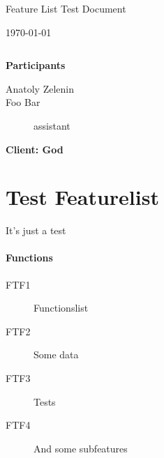 \documentclass[a4paper, 11pt, pdftex, fleqn, review]{article}
\begin{document}
		

		\thispagestyle{empty}

		\vspace*{3cm}
		\begin{center}
		\Large{Feature List Test Document}\\
		\end{center}

		\begin{center}
		\textbf{\LARGE{}}
		\end{center}

		\begin{center}
		\today
		\end{center}

		\begin{verbatim}

		\end{verbatim}
		\begin{center}
		\vspace*{1.5cm}

		\textbf{Participants}
		\\
		\begin{description}
		
			\item[Anatoly Zelenin] 
			\item[Foo Bar] assistant
		\end{description}

		\end{center}

		\vspace*{2cm} 

		\begin{flushleft}
		\textbf{Client: God} 
		\end{flushleft}

		\newpage
		\tableofcontents \newpage
		
		\section{Test Featurelist}

		It's just a test

		\paragraph{Functions}
		\begin{description}
		
			\item[FTF1] Functionslist
			\item[FTF2] Some data
			\item[FTF3] Tests
			\item[FTF4] And some subfeatures
		\end{description}
\end{document}
